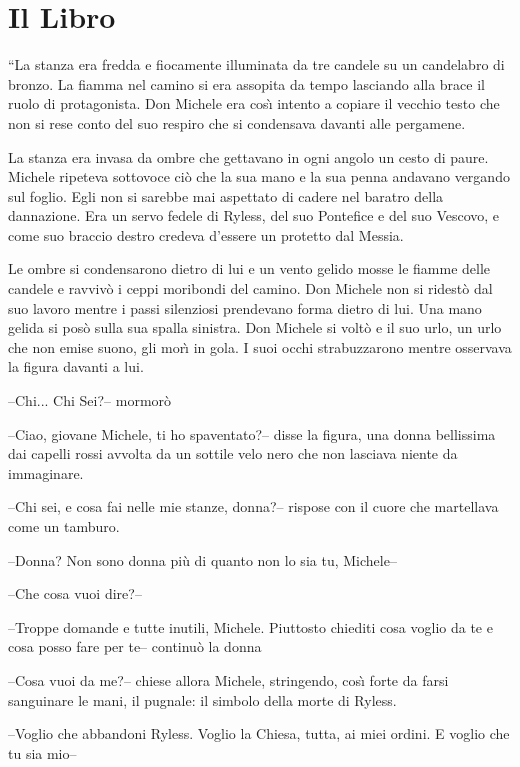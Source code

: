 \onecolumn
\chapter*{Il Libro}
\begin{racconto}
  ``La stanza era fredda e fiocamente illuminata da tre candele su un
  candelabro di bronzo. La fiamma nel camino si era assopita da tempo
  lasciando alla brace il ruolo di protagonista. Don Michele era
  cos\`{\i} intento a copiare il vecchio testo che non si rese conto
  del suo respiro che si condensava davanti alle pergamene.
  
  La stanza era invasa da ombre che gettavano in ogni angolo un cesto
  di paure. Michele ripeteva sottovoce ci\`o che la sua mano e la
  sua penna andavano vergando sul foglio. Egli non si sarebbe mai
  aspettato di cadere nel baratro della dannazione. Era un servo
  fedele di Ryless, del suo Pontefice e del suo Vescovo, e come suo
  braccio destro credeva d'essere un protetto dal Messia.
  
  Le ombre si condensarono dietro di lui e un vento gelido mosse le
  fiamme delle candele e ravviv\`o i ceppi moribondi del camino. Don
  Michele non si ridest\`o dal suo lavoro mentre i passi silenziosi
  prendevano forma dietro di lui. Una mano gelida si pos\`o sulla
  sua spalla sinistra. Don Michele si volt\`o e il suo urlo, un urlo
  che non emise suono, gli mor\`{\i} in gola. I suoi occhi
  strabuzzarono mentre osservava la figura davanti a lui.
  
  --Chi... Chi Sei?-- mormor\`o
  
  --Ciao, giovane Michele, ti ho spaventato?-- disse la figura, una
  donna bellissima dai capelli rossi avvolta da un sottile velo nero
  che non lasciava niente da immaginare.
  
  --Chi sei, e cosa fai nelle mie stanze, donna?-- rispose con il cuore
  che martellava come un tamburo.
  
  --Donna? Non sono donna pi\`u di quanto non lo sia tu, Michele--
  
  --Che cosa vuoi dire?--
  
  --Troppe domande e tutte inutili, Michele. Piuttosto chiediti cosa
  voglio da te e cosa posso fare per te-- continu\`o la donna
  
  --Cosa vuoi da me?-- chiese allora Michele, stringendo, cos\`{\i} forte
  da farsi sanguinare le mani, il pugnale: il simbolo della morte di
  Ryless.
  
  --Voglio che abbandoni Ryless. Voglio la Chiesa, tutta, ai miei
  ordini.  E voglio che tu sia mio--
  

\end{racconto}
